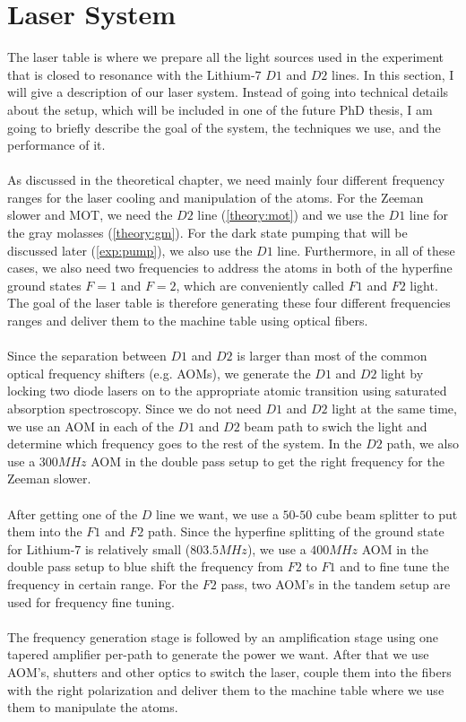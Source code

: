 \section{Laser System}\label{exp:laser-table}
The laser table is where we prepare all the light sources used in the experiment that is closed to resonance with the Lithium-$7$ $D1$ and $D2$ lines. In this section, I will give a description of our laser system. Instead of going into technical details about the setup, which will be included in one of the future PhD thesis, I am going to briefly describe the goal of the system, the techniques we use, and the performance of it.\\
\\
As discussed in the theoretical chapter, we need mainly four different frequency ranges for the laser cooling and manipulation of the atoms. For the Zeeman slower and MOT, we need the $D2$ line (\ref{theory:mot}) and we use the $D1$ line for the gray molasses (\ref{theory:gm}). For the dark state pumping that will be discussed later (\ref{exp:pump}), we also use the $D1$ line. Furthermore, in all of these cases, we also need two frequencies to address the atoms in both of the hyperfine ground states $F=1$ and $F=2$, which are conveniently called $F1$ and $F2$ light. The goal of the laser table is therefore generating these four different frequencies ranges and deliver them to the machine table using optical fibers.\\
\\
Since the separation between $D1$ and $D2$ is larger than most of the common optical frequency shifters (e.g. AOMs), we generate the $D1$ and $D2$ light by locking two diode lasers on to the appropriate atomic transition using saturated absorption spectroscopy. Since we do not need $D1$ and $D2$ light at the same time, we use an AOM in each of the $D1$ and $D2$ beam path to swich the light and determine which frequency goes to the rest of the system. In the $D2$ path, we also use a $300MHz$ AOM in the double pass setup to get the right frequency for the Zeeman slower.\\
\\
After getting one of the $D$ line we want, we use a $50$-$50$ cube beam splitter to put them into the $F1$ and $F2$ path. Since the hyperfine splitting of the ground state for Lithium-$7$ is relatively small ($803.5MHz$), we use a $400MHz$ AOM in the double pass setup to blue shift the frequency from $F2$ to $F1$ and to fine tune the frequency in certain range. For the $F2$ pass, two AOM's in the tandem setup are used for frequency fine tuning.\\
\\
The frequency generation stage is followed by an amplification stage using one tapered amplifier per-path to generate the power we want. After that we use AOM's, shutters and other optics to switch the laser, couple them into the fibers with the right polarization and deliver them to the machine table where we use them to manipulate the atoms.

